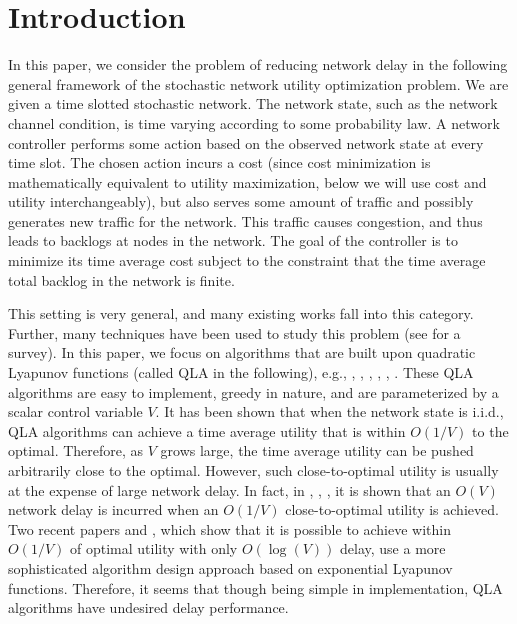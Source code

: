 \documentclass[journal]{IEEEtran}
\begin{document}
\section{Introduction}
In this paper, we consider the problem of reducing network delay in the following general framework of the stochastic network utility optimization problem. We are given a time slotted stochastic network. The network state, such as the network channel condition, is time varying according to some probability law. A network controller performs some action based on the observed network state at every time slot. The chosen action incurs a cost (since cost minimization is mathematically equivalent to utility maximization, below we will use cost and utility interchangeably), but also serves some amount of traffic and possibly generates new traffic for the network.  This traffic causes congestion, and thus leads to backlogs at nodes in the network. The goal of the controller is to minimize its time average cost subject to the constraint that the time average total backlog in the network is finite. 

This setting is very general, and many existing works fall into this category. Further, many techniques have been used to study this problem (see \cite{yichiang_netopt08} for a survey).  In this paper, we focus on algorithms that are built upon quadratic Lyapunov functions (called QLA in the following), e.g., \cite{tassiulas92}, \cite{neelyenergy}, \cite{neelyfairness}, \cite{huangneelypricing}, \cite{rahulneelycognitive}, \cite{neelynowbook}. These QLA algorithms are easy to implement, greedy in nature, and are parameterized by a scalar control variable $V$. It has been shown that when the network state is i.i.d., QLA algorithms can achieve a time average utility that is within $O(1/V)$ to the optimal. Therefore, as $V$ grows large, the time average utility can be pushed arbitrarily close to the optimal. However, such close-to-optimal utility is usually at the expense of large network delay. In fact, in \cite{neelyenergy}, \cite{neelyfairness}, \cite{neelynowbook}, it is shown that an $O(V)$ network delay is incurred when an $O(1/V)$ close-to-optimal utility is achieved. Two recent papers \cite{neelyenergydelay} and \cite{neelysuperfast}, which show that it is possible to achieve within $O(1/V)$ of optimal utility with only $O(\log(V))$ delay, use a more sophisticated algorithm design approach based on exponential Lyapunov functions.  Therefore, it seems that though being simple in implementation, QLA algorithms have undesired delay performance. 
\end{document}
